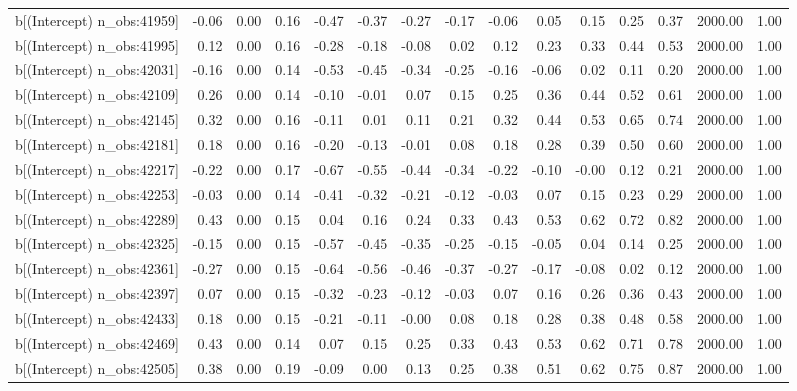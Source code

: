 \begin{table}[ht]
\begin{tabular}{rrrrrrrrrrrrrrr}
  b[(Intercept) n\_obs:41959] & -0.06 & 0.00 & 0.16 & -0.47 & -0.37 & -0.27 & -0.17 & -0.06 & 0.05 & 0.15 & 0.25 & 0.37 & 2000.00 & 1.00 \\ 
  b[(Intercept) n\_obs:41995] & 0.12 & 0.00 & 0.16 & -0.28 & -0.18 & -0.08 & 0.02 & 0.12 & 0.23 & 0.33 & 0.44 & 0.53 & 2000.00 & 1.00 \\ 
  b[(Intercept) n\_obs:42031] & -0.16 & 0.00 & 0.14 & -0.53 & -0.45 & -0.34 & -0.25 & -0.16 & -0.06 & 0.02 & 0.11 & 0.20 & 2000.00 & 1.00 \\ 
  b[(Intercept) n\_obs:42109] & 0.26 & 0.00 & 0.14 & -0.10 & -0.01 & 0.07 & 0.15 & 0.25 & 0.36 & 0.44 & 0.52 & 0.61 & 2000.00 & 1.00 \\ 
  b[(Intercept) n\_obs:42145] & 0.32 & 0.00 & 0.16 & -0.11 & 0.01 & 0.11 & 0.21 & 0.32 & 0.44 & 0.53 & 0.65 & 0.74 & 2000.00 & 1.00 \\ 
  b[(Intercept) n\_obs:42181] & 0.18 & 0.00 & 0.16 & -0.20 & -0.13 & -0.01 & 0.08 & 0.18 & 0.28 & 0.39 & 0.50 & 0.60 & 2000.00 & 1.00 \\ 
  b[(Intercept) n\_obs:42217] & -0.22 & 0.00 & 0.17 & -0.67 & -0.55 & -0.44 & -0.34 & -0.22 & -0.10 & -0.00 & 0.12 & 0.21 & 2000.00 & 1.00 \\ 
  b[(Intercept) n\_obs:42253] & -0.03 & 0.00 & 0.14 & -0.41 & -0.32 & -0.21 & -0.12 & -0.03 & 0.07 & 0.15 & 0.23 & 0.29 & 2000.00 & 1.00 \\ 
  b[(Intercept) n\_obs:42289] & 0.43 & 0.00 & 0.15 & 0.04 & 0.16 & 0.24 & 0.33 & 0.43 & 0.53 & 0.62 & 0.72 & 0.82 & 2000.00 & 1.00 \\ 
  b[(Intercept) n\_obs:42325] & -0.15 & 0.00 & 0.15 & -0.57 & -0.45 & -0.35 & -0.25 & -0.15 & -0.05 & 0.04 & 0.14 & 0.25 & 2000.00 & 1.00 \\ 
  b[(Intercept) n\_obs:42361] & -0.27 & 0.00 & 0.15 & -0.64 & -0.56 & -0.46 & -0.37 & -0.27 & -0.17 & -0.08 & 0.02 & 0.12 & 2000.00 & 1.00 \\ 
  b[(Intercept) n\_obs:42397] & 0.07 & 0.00 & 0.15 & -0.32 & -0.23 & -0.12 & -0.03 & 0.07 & 0.16 & 0.26 & 0.36 & 0.43 & 2000.00 & 1.00 \\ 
  b[(Intercept) n\_obs:42433] & 0.18 & 0.00 & 0.15 & -0.21 & -0.11 & -0.00 & 0.08 & 0.18 & 0.28 & 0.38 & 0.48 & 0.58 & 2000.00 & 1.00 \\ 
  b[(Intercept) n\_obs:42469] & 0.43 & 0.00 & 0.14 & 0.07 & 0.15 & 0.25 & 0.33 & 0.43 & 0.53 & 0.62 & 0.71 & 0.78 & 2000.00 & 1.00 \\ 
  b[(Intercept) n\_obs:42505] & 0.38 & 0.00 & 0.19 & -0.09 & 0.00 & 0.13 & 0.25 & 0.38 & 0.51 & 0.62 & 0.75 & 0.87 & 2000.00 & 1.00 \\ 

\end{tabular}
\end{table}
